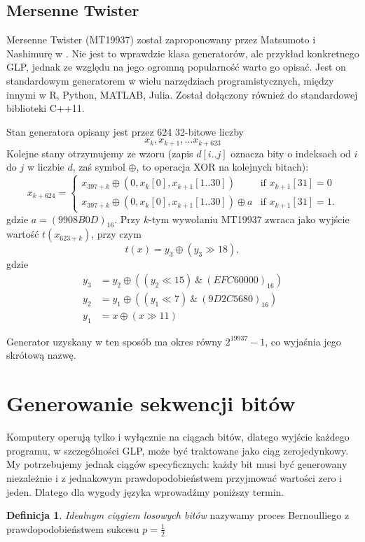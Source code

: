 \documentclass[a4paper,11pt,twoside]{book}
\theoremstyle{definition}
\newtheorem{mydef}{Definicja}[chapter]
\begin{document}
\subsection*{Mersenne Twister}
Mersenne Twister (MT19937) został zaproponowany przez Matsumoto i Nashimurę w \cite{twister}. Nie jest to wprawdzie klasa generatorów, ale przykład konkretnego GLP, jednak ze względu na jego ogromną popularność warto go opisać. Jest on standardowym generatorem w wielu narzędziach programistycznych, między innymi w R, Python, MATLAB, Julia. Został dołączony również do standardowej biblioteki C++11.

Stan generatora opisany jest przez 624 32-bitowe liczby
\[ x_k, x_{k+1}, \ldots x_{k+623} \]
Kolejne stany otrzymujemy ze wzoru (zapis $d[i..j]$ oznacza bity o indeksach od $i$ do $j$ w liczbie $d$, zaś symbol $\oplus$, to operacja XOR na kolejnych bitach):
\[ x_{k+624} = \begin{cases}
      x_{397+k}\oplus (0, x_k[0], x_{k+1}[1..30]) &\mbox{if } x_{k+1}[31] = 0 \\ 
      x_{397+k}\oplus (0, x_k[0], x_{k+1}[1..30]) \oplus a & \mbox{if } x_{k+1}[31] = 1.
    \end{cases} \]
gdzie $a = (9908B0D)_{16}$. Przy $k$-tym wywołaniu MT19937 zwraca jako wyjście wartość $t(x_{623+k})$, przy czym
\[ t(x) = y_3 \oplus (y_3 \gg 18), \]
gdzie
\begin{equation*} 
\begin{split}
 y_3 &= y_2 \oplus ((y_2 \ll 15)\ \&\ (EFC60000)_{16})\\
 y_2 &= y_1 \oplus ((y_1 \ll 7)\ \&\ (9D2C5680)_{16})\\
 y_1 &= x \oplus (x \gg 11)
\end{split}
\end{equation*}

Generator uzyskany w ten sposób ma okres równy $2^{19937}-1$, co wyjaśnia jego skrótową nazwę.

\section{Generowanie sekwencji bitów}
Komputery operują tylko i wyłącznie na ciągach bitów, dlatego wyjście każdego programu, w szczególności GLP, może być traktowane jako ciąg zerojedynkowy. My potrzebujemy jednak ciągów specyficznych: każdy bit musi być generowany niezależnie i z jednakowym prawdopodobieństwem przyjmować wartości zero i jeden. Dlatego dla wygody języka wprowadźmy poniższy termin.
\begin{mydef}
 \textit{Idealnym ciągiem losowych bitów} nazywamy proces Bernoulliego z prawdopodobieństwem sukcesu $p = \frac{1}{2}$
\end{mydef}
\end{document}
